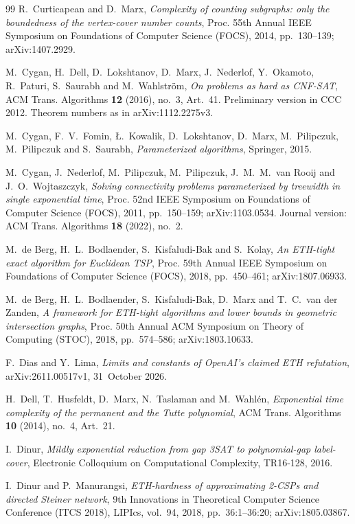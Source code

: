 \documentclass[10pt]{amsart}
\theoremstyle{plain}
\theoremstyle{definition}
\theoremstyle{remark}
\numberwithin{equation}{section}
\begin{document}
\begin{thebibliography}{99}
R.~Curticapean and D.~Marx, \emph{Complexity of counting subgraphs: only the boundedness of the
vertex-cover number counts}, Proc. 55th Annual IEEE Symposium on Foundations of Computer Science
(FOCS), 2014, pp.~130--139; arXiv:1407.2929.

M.~Cygan, H.~Dell, D.~Lokshtanov, D.~Marx, J.~Nederlof, Y.~Okamoto, R.~Paturi, S.~Saurabh and
M.~Wahlstr{\"o}m, \emph{On problems as hard as {CNF-SAT}}, ACM Trans. Algorithms \textbf{12} (2016),
no.~3, Art.~41. Preliminary version in CCC 2012. Theorem numbers as in arXiv:1112.2275v3.

M.~Cygan, F.~V.~Fomin, {\L}.~Kowalik, D.~Lokshtanov, D.~Marx, M.~Pilipczuk, M.~Pilipczuk and
S.~Saurabh, \emph{Parameterized algorithms}, Springer, 2015.

M.~Cygan, J.~Nederlof, M.~Pilipczuk, M.~Pilipczuk, J.~M.~M.~van Rooij and J.~O.~Wojtaszczyk,
\emph{Solving connectivity problems parameterized by treewidth in single exponential time}, Proc.
52nd IEEE Symposium on Foundations of Computer Science (FOCS), 2011, pp.~150--159;
arXiv:1103.0534. Journal version: ACM Trans. Algorithms \textbf{18} (2022), no.~2.

M.~de Berg, H.~L.~Bodlaender, S.~Kisfaludi-Bak and S.~Kolay, \emph{An {ETH}-tight exact algorithm
for {E}uclidean {TSP}}, Proc. 59th Annual IEEE Symposium on Foundations of Computer Science (FOCS),
2018, pp.~450--461; arXiv:1807.06933.

M.~de Berg, H.~L.~Bodlaender, S.~Kisfaludi-Bak, D.~Marx and T.~C.~van der Zanden, \emph{A framework
for {ETH}-tight algorithms and lower bounds in geometric intersection graphs}, Proc. 50th Annual
ACM Symposium on Theory of Computing (STOC), 2018, pp.~574--586; arXiv:1803.10633.

F.~Dias and Y.~Lima, \emph{Limits and constants of {OpenAI}'s claimed {ETH} refutation},
arXiv:2611.00517v1, 31~October 2026.

H.~Dell, T.~Husfeldt, D.~Marx, N.~Taslaman and M.~Wahl{\'e}n, \emph{Exponential time complexity of
the permanent and the {T}utte polynomial}, ACM Trans. Algorithms \textbf{10} (2014), no.~4,
Art.~21.

I.~Dinur, \emph{Mildly exponential reduction from gap {3SAT} to polynomial-gap label-cover},
Electronic Colloquium on Computational Complexity, TR16-128, 2016.

I.~Dinur and P.~Manurangsi, \emph{{ETH}-hardness of approximating 2-{CSP}s and directed {S}teiner
network}, 9th Innovations in Theoretical Computer Science Conference (ITCS 2018), LIPIcs, vol.~94,
2018, pp.~36:1--36:20; arXiv:1805.03867.


\end{thebibliography}
\end{document}
